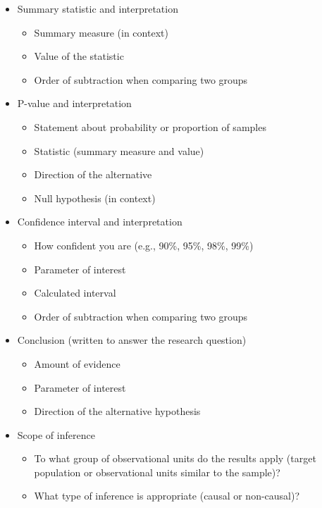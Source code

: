 \documentclass[
]{report}
\begin{document}
\begin{itemize}
\item
  Summary statistic and interpretation

  \begin{itemize}
  \item
    Summary measure (in context)
  \item
    Value of the statistic
  \item
    Order of subtraction when comparing two groups
  \end{itemize}
\item
  P-value and interpretation

  \begin{itemize}
  \item
    Statement about probability or proportion of samples
  \item
    Statistic (summary measure and value)
  \item
    Direction of the alternative
  \item
    Null hypothesis (in context)
  \end{itemize}
\item
  Confidence interval and interpretation

  \begin{itemize}
  \item
    How confident you are (e.g., 90\%, 95\%, 98\%, 99\%)
  \item
    Parameter of interest
  \item
    Calculated interval
  \item
    Order of subtraction when comparing two groups
  \end{itemize}
\item
  Conclusion (written to answer the research question)

  \begin{itemize}
  \item
    Amount of evidence
  \item
    Parameter of interest
  \item
    Direction of the alternative hypothesis
  \end{itemize}
\item
  Scope of inference

  \begin{itemize}
  \item
    To what group of observational units do the results apply (target population or observational units similar to the sample)?
  \item
    What type of inference is appropriate (causal or non-causal)?
  \end{itemize}
\end{itemize}
\end{document}
